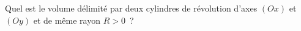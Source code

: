 \begin{exercice}\label{exoIntegralesMultiples0008}

Quel est le volume délimité par deux cylindres de révolution d'axes $(Ox)$ et $(Oy)$ et de même rayon $R>0$~?

\end{exercice}
